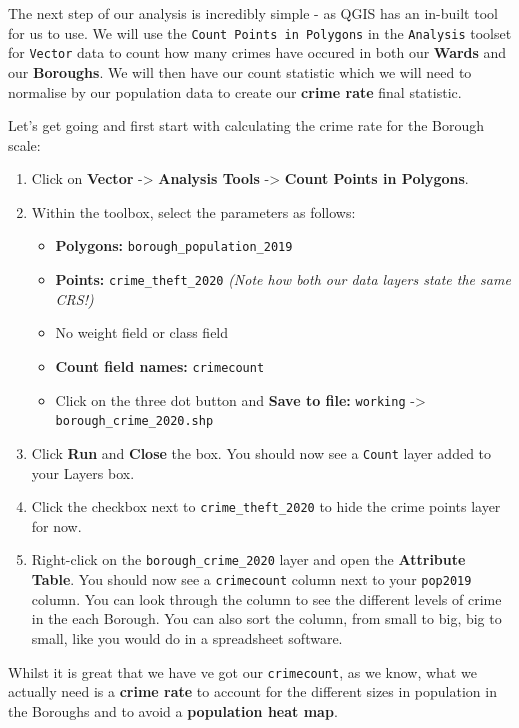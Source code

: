 \documentclass[
]{book}
\providecommand{\tightlist}{%
  \setlength{\itemsep}{0pt}\setlength{\parskip}{0pt}}
\begin{document}
The next step of our analysis is incredibly simple - as QGIS has an in-built tool for us to use. We will use the \texttt{Count\ Points\ in\ Polygons} in the \texttt{Analysis} toolset for \texttt{Vector} data to count how many crimes have occured in both our \textbf{Wards} and our \textbf{Boroughs}. We will then have our count statistic which we will need to normalise by our population data to create our \textbf{crime rate} final statistic.

Let's get going and first start with calculating the crime rate for the Borough scale:

\begin{enumerate}
\def\labelenumi{\arabic{enumi}.}
\item
  Click on \textbf{Vector} -\textgreater{} \textbf{Analysis Tools} -\textgreater{} \textbf{Count Points in Polygons}.
\item
  Within the toolbox, select the parameters as follows:

  \begin{itemize}
  \tightlist
  \item
    \textbf{Polygons:} \texttt{borough\_population\_2019}
  \item
    \textbf{Points:} \texttt{crime\_theft\_2020} \emph{(Note how both our data layers state the same CRS!)}
  \item
    No weight field or class field
  \item
    \textbf{Count field names:} \texttt{crimecount}
  \item
    Click on the three dot button and \textbf{Save to file:} \texttt{working} -\textgreater{} \texttt{borough\_crime\_2020.shp}
  \end{itemize}
\item
  Click \textbf{Run} and \textbf{Close} the box. You should now see a \texttt{Count} layer added to your Layers box.
\item
  Click the checkbox next to \texttt{crime\_theft\_2020} to hide the crime points layer for now.
\item
  Right-click on the \texttt{borough\_crime\_2020} layer and open the \textbf{Attribute Table}. You should now see a \texttt{crimecount} column next to your \texttt{pop2019} column. You can look through the column to see the different levels of crime in the each Borough. You can also sort the column, from small to big, big to small, like you would do in a spreadsheet software.
\end{enumerate}

Whilst it is great that we have ve got our \texttt{crimecount}, as we know, what we actually need is a \textbf{crime rate} to account for the different sizes in population in the Boroughs and to avoid a \textbf{population heat map}.
\end{document}
